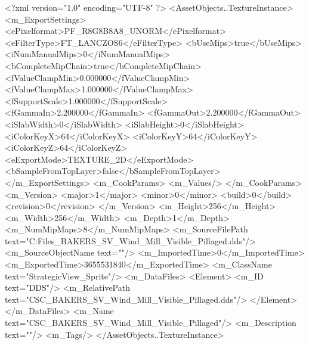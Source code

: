 <?xml version="1.0" encoding="UTF-8" ?>
<AssetObjects..TextureInstance>
	<m_ExportSettings>
		<ePixelformat>PF_R8G8B8A8_UNORM</ePixelformat>
		<eFilterType>FT_LANCZOS6</eFilterType>
		<bUseMips>true</bUseMips>
		<iNumManualMips>0</iNumManualMips>
		<bCompleteMipChain>true</bCompleteMipChain>
		<fValueClampMin>0.000000</fValueClampMin>
		<fValueClampMax>1.000000</fValueClampMax>
		<fSupportScale>1.000000</fSupportScale>
		<fGammaIn>2.200000</fGammaIn>
		<fGammaOut>2.200000</fGammaOut>
		<iSlabWidth>0</iSlabWidth>
		<iSlabHeight>0</iSlabHeight>
		<iColorKeyX>64</iColorKeyX>
		<iColorKeyY>64</iColorKeyY>
		<iColorKeyZ>64</iColorKeyZ>
		<eExportMode>TEXTURE_2D</eExportMode>
		<bSampleFromTopLayer>false</bSampleFromTopLayer>
	</m_ExportSettings>
	<m_CookParams>
		<m_Values/>
	</m_CookParams>
	<m_Version>
		<major>1</major>
		<minor>0</minor>
		<build>0</build>
		<revision>0</revision>
	</m_Version>
	<m_Height>256</m_Height>
	<m_Width>256</m_Width>
	<m_Depth>1</m_Depth>
	<m_NumMipMaps>8</m_NumMipMaps>
	<m_SourceFilePath text="C:\Users\Shadow\Desktop\Working Files\Icons\StrategicView\CSC_BAKERS_SV_Wind_Mill_Visible_Pillaged.dds"/>
	<m_SourceObjectName text=""/>
	<m_ImportedTime>0</m_ImportedTime>
	<m_ExportedTime>3655531840</m_ExportedTime>
	<m_ClassName text="StrategicView_Sprite"/>
	<m_DataFiles>
		<Element>
			<m_ID text="DDS"/>
			<m_RelativePath text="CSC_BAKERS_SV_Wind_Mill_Visible_Pillaged.dds"/>
		</Element>
	</m_DataFiles>
	<m_Name text="CSC_BAKERS_SV_Wind_Mill_Visible_Pillaged"/>
	<m_Description text=""/>
	<m_Tags/>
</AssetObjects..TextureInstance>

